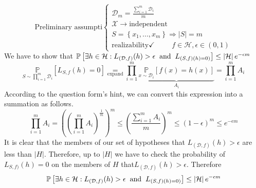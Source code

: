 \documentclass[]{book}
\begin{document}
\begin{equation*}
\text{Preliminary assumpti} \left\{\begin{matrix}
\mathcal{D}_m=\frac{\sum_{i=1}^{m}\mathcal{D}_i}{m}\\
\mathcal{X}\rightarrow \text{independent}
\\ S=\left \{ x_1,...,x_m \right \}\Rightarrow \left | S \right |=m 
\\ \text{realizability}\checkmark\hspace{1cm} f\in\mathcal{H},\epsilon \in (0,1)
\end{matrix}\right.
\end{equation*}
We have to show that $\mathbb{P}\left [ \exists h \in \mathcal{H}: L_{(\mathcal{D},f)}(h)>\epsilon \hspace{0.2cm}\text{and}\hspace{0.2cm} L_{(S,f)(h)=0)} \right ] \leq \left | \mathcal{H} \right |e^{-\epsilon m}$
\begin{equation*}
    \underset{S\sim\prod_{i=1}^{m}\mathcal{D}_i}{\mathbb{P}}[L_{S,f}(h)=0]\underset{\text{expand}}{=}\prod_{i=1}^{m}\underset{A_i}{\underbrace{\underset{x\sim \mathcal{D}_i}{\mathbb{P}}\left [ f(x)=h(x) \right ]}}=\prod_{i=1}^{m}A_i
\end{equation*}
According to the question form's hint, we can convert this expression into a summation as follows.
\begin{equation*}
    \prod_{i=1}^{m}A_i=\left (\left ( \prod_{i=1}^{m}A_i \right )^{\frac{1}{m}}  \right )^m\leq \left ( \frac{\sum_{i=1}^{m}A_i}{m} \right )^m\leq (1-\epsilon)^m\leq e^{-\epsilon m}
\end{equation*}
It is clear that the members of our set of hypotheses that $L_{(\mathcal{D},f)}(h)>\epsilon$ are less than $|H|$.  Therefore, up to $|H|$ we have to check the probability of $L_{S,f)}(h)=0$ on the members of $H$ that$L_{(\mathcal{D},f)}(h)>\epsilon$. Therefore
\begin{equation*}
    \mathbb{P}\left [ \exists h \in \mathcal{H}: L_{(\mathcal{D},f)}(h)>\epsilon \hspace{0.2cm}\text{and}\hspace{0.2cm} L_{(S,f)(h)=0)} \right ] \leq \left | \mathcal{H} \right |e^{-\epsilon m}
\end{equation*}
\end{document}
